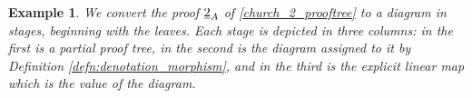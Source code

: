 \documentclass[english,letter paper,12pt,reqno]{article}
\theoremstyle{example}
\newtheorem{example}[theorem]{Example}
\begin{document}

\begin{example}\label{example:church_2} We convert the proof $\underline{2}_A$ of \eqref{church_2_prooftree} to a diagram in stages, beginning with the leaves. Each stage is depicted in three columns: in the first is a partial proof tree, in the second is the diagram assigned to it by Definition \ref{defn:denotation_morphism}, and in the third is the explicit linear map which is the value of the diagram. 


\end{example}
\end{document}

